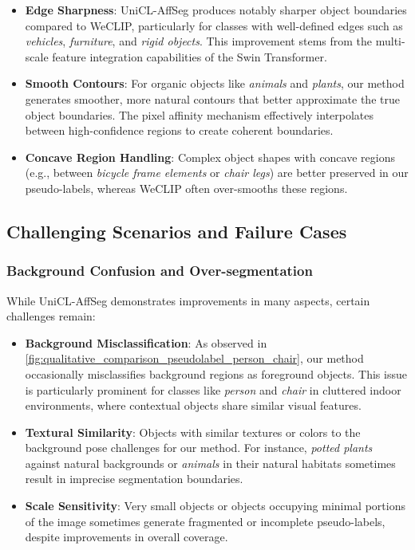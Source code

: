 \begin{itemize}
    \item \textbf{Edge Sharpness}: UniCL-AffSeg produces notably sharper object boundaries compared to WeCLIP, particularly for classes with well-defined edges such as \textit{vehicles}, \textit{furniture}, and \textit{rigid objects}. This improvement stems from the multi-scale feature integration capabilities of the Swin Transformer.
    
    \item \textbf{Smooth Contours}: For organic objects like \textit{animals} and \textit{plants}, our method generates smoother, more natural contours that better approximate the true object boundaries. The pixel affinity mechanism effectively interpolates between high-confidence regions to create coherent boundaries.
    
    \item \textbf{Concave Region Handling}: Complex object shapes with concave regions (e.g., between \textit{bicycle frame elements} or \textit{chair legs}) are better preserved in our pseudo-labels, whereas WeCLIP often over-smooths these regions.
\end{itemize}

\subsection{Challenging Scenarios and Failure Cases}
\label{subsec:challenging_scenarios}

\subsubsection{Background Confusion and Over-segmentation}
\label{subsubsec:background_confusion}

While UniCL-AffSeg demonstrates improvements in many aspects, certain challenges remain:

\begin{itemize}
    \item \textbf{Background Misclassification}: As observed in \autoref{fig:qualitative_comparison_pseudolabel_person_chair}, our method occasionally misclassifies background regions as foreground objects. This issue is particularly prominent for classes like \textit{person} and \textit{chair} in cluttered indoor environments, where contextual objects share similar visual features.
    
    \item \textbf{Textural Similarity}: Objects with similar textures or colors to the background pose challenges for our method. For instance, \textit{potted plants} against natural backgrounds or \textit{animals} in their natural habitats sometimes result in imprecise segmentation boundaries.
    
    \item \textbf{Scale Sensitivity}: Very small objects or objects occupying minimal portions of the image sometimes generate fragmented or incomplete pseudo-labels, despite improvements in overall coverage.
\end{itemize}

